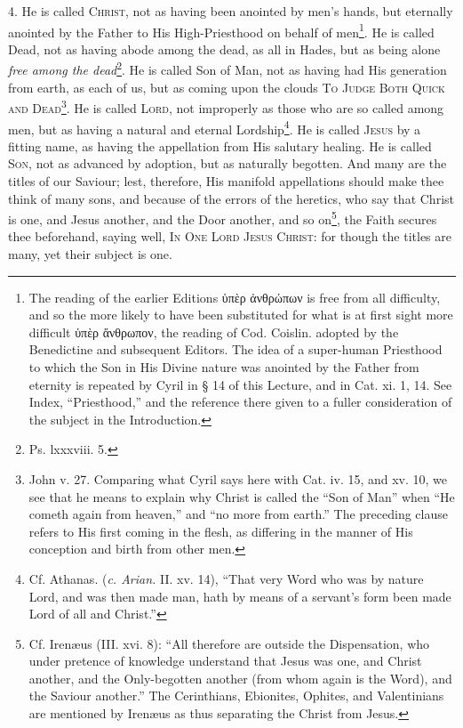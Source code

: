 4. He is called \textsc{Christ}, not as having been anointed by men’s hands, but eternally anointed by the Father to His High-Priesthood on behalf of men\footnote{The reading of the earlier Editions \textgreek{ὑπὲρ ἀνθρώπων} is free from all difficulty, and so the more likely to have been substituted for what is at first sight more difficult \textgreek{ὑπὲρ ἄνθρωπον}, the reading of Cod. Coislin. adopted by the Benedictine and subsequent Editors. The idea of a super-human Priesthood to which the Son in His Divine nature was anointed by the Father from eternity is repeated by Cyril in § 14 of this Lecture, and in Cat. xi. 1, 14. See Index, “Priesthood,” and the reference there given to a fuller consideration of the subject in the Introduction.}. He is called Dead, not as having abode among the dead, as all in Hades, but as being alone \emph{free among the dead}\footnote{Ps. lxxxviii. 5.}. He is called Son of Man, not as having had His generation from earth, as each of us, but as coming upon the clouds \textsc{To Judge Both Quick and Dead\footnote{John v. 27. Comparing what Cyril says here with Cat. iv. 15, and xv. 10, we see that he means to explain why Christ is called the “Son of Man” when “He cometh again from heaven,” and “no more from earth.” The preceding clause refers to His first coming in the flesh, as differing in the manner of His conception and birth from other men.}}. He is called \textsc{Lord}, not improperly as those who are so called among men, but as having a natural and eternal Lordship\footnote{Cf. Athanas. (\emph{c. Arian.} II. xv. 14), “That very Word who was by nature Lord, and was then made man, hath by means of a servant’s form been made Lord of all and Christ.”}. He is called \textsc{Jesus} by a fitting name, as having the appellation from His salutary healing. He is called \textsc{Son}, not as advanced by adoption, but as naturally begotten. And many are the titles of our Saviour; lest, therefore, His manifold appellations should make thee think of many sons, and because of the errors of the heretics, who say that Christ is one, and Jesus another, and the Door another, and so on\footnote{Cf. Irenæus (III. xvi. 8): “All therefore are outside the Dispensation, who under pretence of knowledge understand that Jesus was one, and Christ another, and the Only-begotten another (from whom again is the Word), and the Saviour another.” The Cerinthians, Ebionites, Ophites, and Valentinians are mentioned by Irenæus as thus separating the Christ from Jesus.}, the Faith secures thee beforehand, saying well, \textsc{In One Lord Jesus Christ}: for though the titles are many, yet their subject is one.

